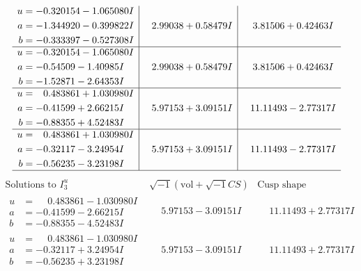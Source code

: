 \documentclass[1p]{elsarticle_modified}
\theoremstyle{definition}
\newcommand{\I}{\sqrt{-1}}
\begin{document}
$$\begin{array}{c|c|c}
\begin{aligned}
u &= -0.320154 - 1.065080 I \\
a &= -1.344920 - 0.399822 I \\
b &= -0.333397 - 0.527308 I\end{aligned}
 & \phantom{-}2.99038 + 0.58479 I & \phantom{-}3.81506 + 0.42463 I \\ \hline\begin{aligned}
u &= -0.320154 - 1.065080 I \\
a &= -0.54509 - 1.40985 I \\
b &= -1.52871 - 2.64353 I\end{aligned}
 & \phantom{-}2.99038 + 0.58479 I & \phantom{-}3.81506 + 0.42463 I \\ \hline\begin{aligned}
u &= \phantom{-}0.483861 + 1.030980 I \\
a &= -0.41599 + 2.66215 I \\
b &= -0.88355 + 4.52483 I\end{aligned}
 & \phantom{-}5.97153 + 3.09151 I & \phantom{-}11.11493 - 2.77317 I \\ \hline\begin{aligned}
u &= \phantom{-}0.483861 + 1.030980 I \\
a &= -0.32117 - 3.24954 I \\
b &= -0.56235 - 3.23198 I\end{aligned}
 & \phantom{-}5.97153 + 3.09151 I & \phantom{-}11.11493 - 2.77317 I\\
 \hline 
 \end{array}$$\newpage$$\begin{array}{c|c|c}  
\text{Solutions to }I^u_{3}& \I (\text{vol} + \sqrt{-1}CS) & \text{Cusp shape}\\
 \hline 
\begin{aligned}
u &= \phantom{-}0.483861 - 1.030980 I \\
a &= -0.41599 - 2.66215 I \\
b &= -0.88355 - 4.52483 I\end{aligned}
 & \phantom{-}5.97153 - 3.09151 I & \phantom{-}11.11493 + 2.77317 I \\ \hline\begin{aligned}
u &= \phantom{-}0.483861 - 1.030980 I \\
a &= -0.32117 + 3.24954 I \\
b &= -0.56235 + 3.23198 I\end{aligned}
 & \phantom{-}5.97153 - 3.09151 I & \phantom{-}11.11493 + 2.77317 I \\ \hline\begin{aligned}

\end{aligned}
\end{array}$$
\end{document}
